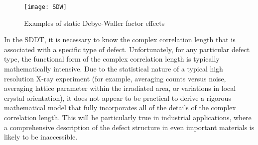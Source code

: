 \begin{figure}[h]
\centering
\caption{Examples of static Debye-Waller factor effects}
\label{SDW}
\texttt{[image: SDW]}
\end{figure}



In the SDDT, it is necessary to know the complex correlation length that is associated with a specific type of defect. Unfortunately, for any particular defect type, the functional form of the complex correlation length is typically mathematically intensive. Due to the statistical nature of a typical high resolution X-ray experiment (for example, averaging counts versus noise, averaging lattice parameter within the irradiated area, or variations in local crystal orientation), it does not appear to be practical to derive a rigorous mathematical model that fully incorporates all of the details of the complex correlation length. This will be particularly true in industrial applications, where a comprehensive description of the defect structure in even important materials is likely to be inaccessible.

